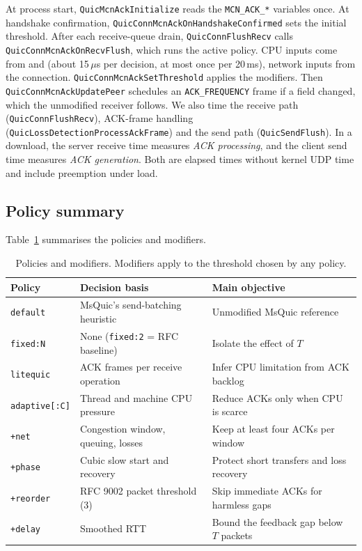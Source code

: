 \documentclass[11pt]{article}
\newcommand{\pol}[1]{\texttt{#1}}            %
\newcommand{\ms}{\,ms}
\begin{document}
At process start, \pol{QuicMcnAckInitialize} reads the \pol{MCN\_ACK\_*} variables once. At
handshake confirmation, \pol{QuicConnMcnAckOnHandshakeConfirmed} sets the initial threshold. After
each receive-queue drain, \pol{QuicConnFlushRecv} calls \pol{QuicConnMcnAckOnRecvFlush}, which
runs the active policy. CPU inputs come from  and
 (about 15\,$\mu$s per decision, at most once per 20\ms), network inputs from the
connection. \pol{QuicConnMcnAckSetThreshold} applies the
modifiers. Then \pol{QuicConnMcnAckUpdatePeer} schedules an \pol{ACK\_FREQUENCY} frame if a field
changed, which the unmodified receiver follows. We also time the receive path
(\pol{QuicConnFlushRecv}), ACK-frame handling (\pol{QuicLossDetection\allowbreak ProcessAckFrame}) and the
send path (\pol{QuicSendFlush}). In a download, the server receive time measures \emph{ACK
processing}, and the client send time measures \emph{ACK generation}. Both are elapsed times
without kernel UDP time and include preemption under load.

\subsection{Policy summary}
Table~\ref{tab:policies} summarises the policies and modifiers.

\begin{table}[H]
  \centering
  \small
  \caption{Policies and modifiers. Modifiers apply to the threshold chosen by any policy.}
  \label{tab:policies}
  \begin{tabularx}{\textwidth}{@{}p{2.65cm}p{5.5cm}X@{}}
    \toprule
    Policy & Decision basis & Main objective \\
    \midrule
    \pol{default}      & MsQuic's send-batching heuristic     & Unmodified MsQuic reference \\
    \pol{fixed:N}      & None (\pol{fixed:2} = RFC baseline)  & Isolate the effect of $T$ \\
    \pol{litequic}     & ACK frames per receive operation     & Infer CPU limitation from ACK backlog \\
    \pol{adaptive[:C]} & Thread and machine CPU pressure      & Reduce ACKs only when CPU is scarce \\
    \pol{+net}         & Congestion window, queuing, losses   & Keep at least four ACKs per window \\
    \pol{+phase}       & Cubic slow start and recovery        & Protect short transfers and loss recovery \\
    \pol{+reorder}     & RFC 9002 packet threshold (3)        & Skip immediate ACKs for harmless gaps \\
    \pol{+delay}       & Smoothed RTT                         & Bound the feedback gap below $T$ packets \\
    \bottomrule
  \end{tabularx}
\end{table}
\end{document}
